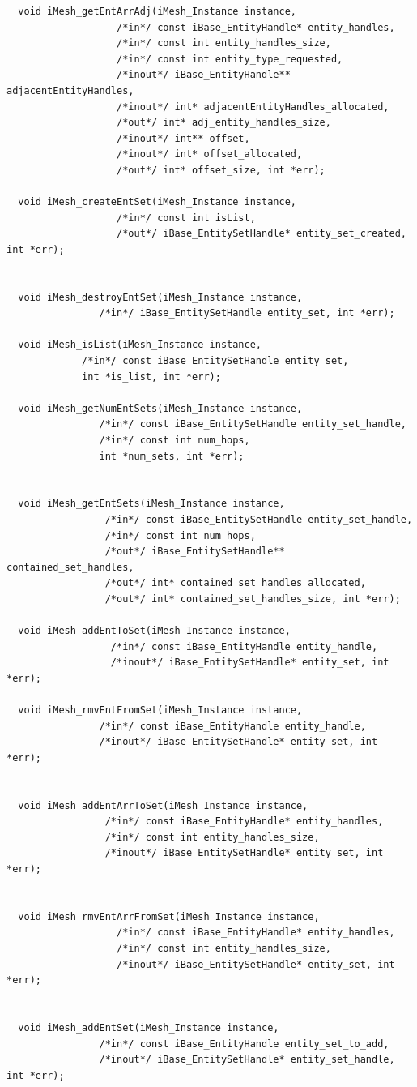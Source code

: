 \documentclass{article}
\begin{document}
\begin{small}
\begin{verbatim}
  void iMesh_getEntArrAdj(iMesh_Instance instance,
			       /*in*/ const iBase_EntityHandle* entity_handles,
			       /*in*/ const int entity_handles_size,
			       /*in*/ const int entity_type_requested,
			       /*inout*/ iBase_EntityHandle** adjacentEntityHandles,
			       /*inout*/ int* adjacentEntityHandles_allocated,
			       /*out*/ int* adj_entity_handles_size,
			       /*inout*/ int** offset,
			       /*inout*/ int* offset_allocated,
			       /*out*/ int* offset_size, int *err);

  void iMesh_createEntSet(iMesh_Instance instance,
			       /*in*/ const int isList,
			       /*out*/ iBase_EntitySetHandle* entity_set_created, int *err);


  void iMesh_destroyEntSet(iMesh_Instance instance,
				/*in*/ iBase_EntitySetHandle entity_set, int *err);

  void iMesh_isList(iMesh_Instance instance,
			 /*in*/ const iBase_EntitySetHandle entity_set,
			 int *is_list, int *err);

  void iMesh_getNumEntSets(iMesh_Instance instance,
				/*in*/ const iBase_EntitySetHandle entity_set_handle,
				/*in*/ const int num_hops,
				int *num_sets, int *err);


  void iMesh_getEntSets(iMesh_Instance instance,
			     /*in*/ const iBase_EntitySetHandle entity_set_handle,
			     /*in*/ const int num_hops,
			     /*out*/ iBase_EntitySetHandle** contained_set_handles,
			     /*out*/ int* contained_set_handles_allocated,
			     /*out*/ int* contained_set_handles_size, int *err);

  void iMesh_addEntToSet(iMesh_Instance instance,
			      /*in*/ const iBase_EntityHandle entity_handle,
			      /*inout*/ iBase_EntitySetHandle* entity_set, int *err);

  void iMesh_rmvEntFromSet(iMesh_Instance instance,
				/*in*/ const iBase_EntityHandle entity_handle,
				/*inout*/ iBase_EntitySetHandle* entity_set, int *err);


  void iMesh_addEntArrToSet(iMesh_Instance instance,
				 /*in*/ const iBase_EntityHandle* entity_handles,
				 /*in*/ const int entity_handles_size,
				 /*inout*/ iBase_EntitySetHandle* entity_set, int *err);


  void iMesh_rmvEntArrFromSet(iMesh_Instance instance,
				   /*in*/ const iBase_EntityHandle* entity_handles,
				   /*in*/ const int entity_handles_size,
				   /*inout*/ iBase_EntitySetHandle* entity_set, int *err);


  void iMesh_addEntSet(iMesh_Instance instance,
			    /*in*/ const iBase_EntityHandle entity_set_to_add,
			    /*inout*/ iBase_EntitySetHandle* entity_set_handle, int *err);



\end{verbatim}
\end{small}
\end{document}
